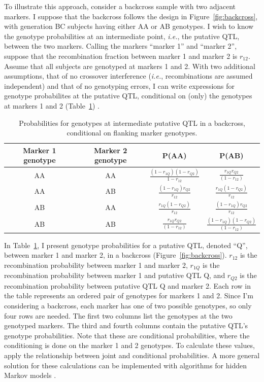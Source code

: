 \documentclass[oneside]{book}\usepackage[]{graphicx}\usepackage[]{color}
\begin{document}
To illustrate this approach, consider a backcross sample with two adjacent markers. I suppose 
that the backcross follows the design in Figure~\ref{fig:backcross}, with generation BC subjects 
having either AA or AB genotypes. I wish to know the genotype probabilities at an intermediate 
point, \emph{i.e.}, the putative QTL, between the two markers. Calling the markers ``marker 1'' 
and ``marker 2'', suppose that the recombination fraction between marker 1 and marker 2 is 
$r_{12}$. Assume that all subjects are genotyped at markers 1 and 2. With two additional 
assumptions, that of no crossover interference (\emph{i.e.}, recombinations are 
assumed independent) and that of no genotyping errors, I can write 
expressions for genotype probabilites at the putative QTL, conditional on (only) the genotypes at 
markers 1 and 2 (Table~\ref{tab:genoprob}) \citep{broman2009guide}.

\begin{table}
\caption{Probabilities for genotypes at intermediate putative QTL in a backcross, conditional on flanking marker genotypes.}\label{tab:genoprob}
\begin{tabular}{cccc}
\hline
Marker 1 genotype & Marker 2 genotype & P(AA) & P(AB) \\
\hline
AA & AA & $\frac{(1- r_{1Q})(1-r_{Q2})}{1-r_{12}}$ & $\frac{r_{1Q}r_{Q2}}{(1-r_{12})}$ \\
AA & AB & $\frac{(1-r_{1Q})r_{Q2}}{r_{12}}$ & $\frac{r_{1Q}(1-r_{Q2})}{r_{12}}$ \\
AB & AA & $\frac{r_{1Q}(1-r_{Q2})}{r_{12}}$ & $\frac{(1-r_{1Q})r_{Q2}}{r_{12}}$ \\
AB & AB & $\frac{r_{1Q}r_{Q2}}{(1-r_{12})}$ & $\frac{(1-r_{1Q})(1-r_{Q2})}{(1-r_{12})}$\\
\hline
\end{tabular}
\end{table}

In Table~\ref{tab:genoprob}, I present genotype probabilities for a putative QTL, denoted ``Q'', 
between marker 1 and marker 2, in a backcross (Figure~\ref{fig:backcross}). $r_{12}$ is the 
recombination probability between marker 1 and marker 2, $r_{1Q}$ is the recombination probability
between marker 1 and putative QTL Q, and $r_{Q2}$ is the recombination probability between 
putative QTL Q and marker 2. 
Each row in the table represents an ordered pair of genotypes for markers 1 and 2. Since I'm 
considering a backcross, each marker has one of two possible genotypes, so only four rows are 
needed. The first two columns list the genotypes at the two genotyped markers. The third and 
fourth columns contain the putative QTL's genotype probabilities. Note that these are 
conditional probabilities, where the conditioning is done on the marker 1 and 2 genotypes. To calculate 
these values, apply the relationship between joint and conditional probabilities. 
A more general solution for 
these calculations can be implemented with algorithms for hidden Markov 
models \citep{broman2009guide, broman2006use}.
\end{document}
